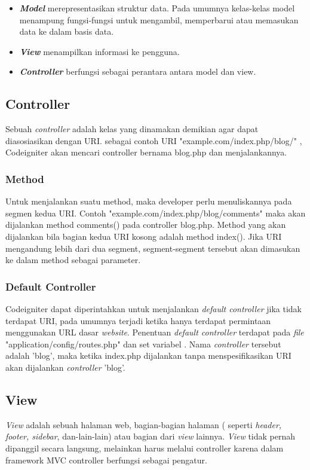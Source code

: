 \begin{itemize}
		\item \textbf{\textit{Model}} merepresentasikan struktur data. Pada umumnya kelas-kelas model menampung fungsi-fungsi untuk mengambil, memperbarui atau memasukan data ke dalam basis data.
		\item \textbf{\textit{View}} menampilkan informasi ke pengguna. 
		\item \textbf{\textit{Controller}} berfungsi sebagai perantara antara model dan view.
\end{itemize}

\subsection{Controller}
Sebuah \textit{controller} adalah kelas yang dinamakan demikian agar dapat diasosiasikan dengan URI.
sebagai contoh URI "example.com/index.php/blog/" , Codeigniter akan mencari controller bernama blog.php dan menjalankannya.

	\subsubsection{Method}
	Untuk menjalankan suatu method, maka developer perlu menuliskannya pada segmen kedua URI. Contoh "example.com/index.php/blog/comments" maka akan dijalankan method comments() pada controller blog.php. Method yang akan dijalankan bila bagian kedua URI kosong adalah method index(). Jika URI mengandung lebih dari dua segment, segment-segment tersebut akan dimasukan ke dalam method sebagai parameter.
	
	\subsubsection{Default Controller}
	Codeigniter dapat diperintahkan untuk menjalankan \textit{default controller} jika tidak terdapat URI, pada umumnya terjadi ketika hanya terdapat permintaan menggunakan URL dasar \textit{website}. Penentuan \textit{default controller} terdapat pada \textit{file} "application/config/routes.php" dan set variabel . Nama \textit{controller} tersebut adalah 'blog', maka ketika index.php dijalankan tanpa menspesifikasikan URI akan dijalankan \textit{controller} 'blog'.

\subsection{View}
\textit{View} adalah sebuah halaman web, bagian-bagian halaman ( seperti \textit{header, footer, sidebar}, dan-lain-lain) atau bagian dari \textit{view} lainnya. \textit{View} tidak pernah dipanggil secara langsung, melainkan harus melalui controller karena dalam framework MVC controller berfungsi sebagai pengatur.

